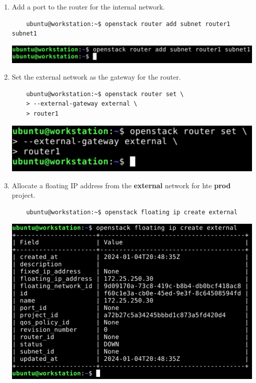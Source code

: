 \documentclass[letterpaper, 12pt]{article}
\begin{document}
\begin{enumerate}
    \item Add a port to the router for the internal network.
    \begin{lstlisting}
    ubuntu@workstation:~$ openstack router add subnet router1 subnet1
    \end{lstlisting}

    \begin{center}
        \includegraphics[width=\linewidth]{images/part1/step24.png}
    \end{center}

    \item Set the external network as the gateway for the router.
    \begin{lstlisting}
    ubuntu@workstation:~$ openstack router set \
    > --external-gateway external \
    > router1
    \end{lstlisting}

    \begin{center}
        \includegraphics[width=\linewidth]{images/part1/step25.png}
    \end{center}

    \item Allocate a floating IP address from the \textbf{external} network for hte \textbf{prod} project.
    \begin{lstlisting}
    ubuntu@workstation:~$ openstack floating ip create external
    \end{lstlisting}

    \begin{center}
        \includegraphics[width=\linewidth]{images/part1/step26.png}
    \end{center}


\end{enumerate}
\end{document}
